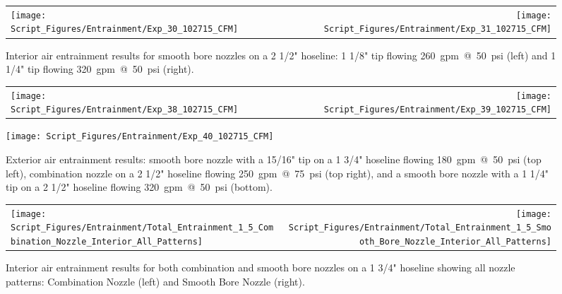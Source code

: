 \documentclass[12pt,oneside]{book}
\begin{document}
\clearpage

\begin{figure}[!ht]
\begin{tabular*}{\textwidth}{lr}
\texttt{[image: Script\_Figures/Entrainment/Exp\_30\_102715\_CFM]} &
\texttt{[image: Script\_Figures/Entrainment/Exp\_31\_102715\_CFM]} \\
\end{tabular*}
\caption[Air Entrainment for 2~1/2~in. Hoseline with Smooth Bore Nozzle from Interior]{Interior air entrainment results for smooth bore nozzles on a 2 1/2" hoseline: 1 1/8" tip flowing 260~gpm~@~50~psi (left) and 1 1/4" tip flowing 320~gpm~@~50~psi (right).}
\label{fig:2_5_Interior_Smooth_Bore}
\end{figure}

\clearpage

\begin{figure}[!ht]
\begin{tabular*}{\textwidth}{lr}
\texttt{[image: Script\_Figures/Entrainment/Exp\_38\_102715\_CFM]} &
\texttt{[image: Script\_Figures/Entrainment/Exp\_39\_102715\_CFM]} \\
\end{tabular*}
\centering
\texttt{[image: Script\_Figures/Entrainment/Exp\_40\_102715\_CFM]} 
\caption[Air Entrainment for 2~1/2~in. Hoseline with Smooth Bore Nozzle from Exterior]{Exterior air entrainment results: smooth bore nozzle with a 15/16" tip on a 1 3/4" hoseline flowing 180~gpm~@~50~psi (top left), combination nozzle on a 2 1/2" hoseline flowing 250~gpm~@~75~psi (top right), and a smooth bore nozzle with a 1 1/4" tip on a 2 1/2" hoseline flowing 320~gpm~@~50~psi (bottom).}
\label{fig:Exterior_Tests}
\end{figure}

\clearpage

\begin{figure}[!ht]
\begin{tabular*}{\textwidth}{lr}
\texttt{[image: Script\_Figures/Entrainment/Total\_Entrainment\_1\_5\_Combination\_Nozzle\_Interior\_All\_Patterns]} &
\texttt{[image: Script\_Figures/Entrainment/Total\_Entrainment\_1\_5\_Smooth\_Bore\_Nozzle\_Interior\_All\_Patterns]} \\
\end{tabular*}
\caption[Air Entrainment for 1~3/4~in. Hoseline with All Nozzle Patterns from Interior]{Interior air entrainment results for both combination and smooth bore nozzles on a 1 3/4" hoseline showing all nozzle patterns: Combination Nozzle (left) and Smooth Bore Nozzle (right).}
\label{fig:1_5_Interior_SS_SB_All_Patterns}
\end{figure}
\end{document}
